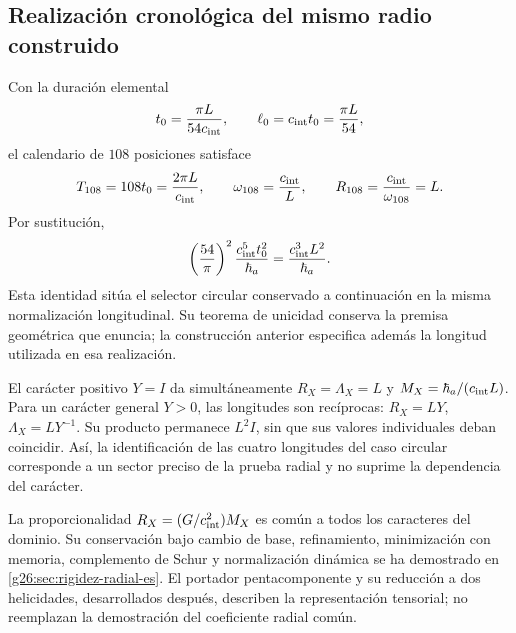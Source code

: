 \subsection{Realización cronológica del mismo radio construido}
\label{cr28:sec:radial-clock}
Con la duración elemental
\begin{equation}
 t_0=\frac{\pi L}{54c_{\rm int}},
 \qquad \ell_0=c_{\rm int}t_0=\frac{\pi L}{54},
 \label{cr28:eq:clock-from-length}
\end{equation}
el calendario de \(108\) posiciones satisface
\[
 T_{108}=108t_0=\frac{2\pi L}{c_{\rm int}},\qquad
 \omega_{108}=\frac{c_{\rm int}}{L},\qquad
 R_{108}=\frac{c_{\rm int}}{\omega_{108}}=L.
\]
Por sustitución,
\begin{equation}
 \left(\frac{54}{\pi}\right)^2
 \frac{c_{\rm int}^5t_0^2}{\hbar_a}
 =\frac{c_{\rm int}^3L^2}{\hbar_a}.
 \label{cr28:eq:circular-radial-agreement}
\end{equation}
Esta identidad sitúa el selector circular conservado a continuación en
la misma normalización longitudinal. Su teorema de unicidad conserva la
premisa geométrica que enuncia; la construcción anterior especifica además
la longitud utilizada en esa realización.

El carácter positivo \(Y=I\) da simultáneamente
\(R_X=\Lambda_X=L\) y \(M_X=\hbar_a/(c_{\rm int}L)\).
Para un carácter general \(Y>0\), las longitudes son recíprocas:
\(R_X=LY\), \(\Lambda_X=LY^{-1}\).
Su producto permanece \(L^2I\), sin que sus valores individuales deban
coincidir. Así, la identificación de las cuatro longitudes del caso
circular corresponde a un sector preciso de la prueba radial y no
suprime la dependencia del carácter.

La proporcionalidad \(R_X=(G/c_{\rm int}^{2})M_X\) es común a
todos los caracteres del dominio. Su conservación bajo cambio de base,
refinamiento, minimización con memoria, complemento de Schur y
normalización dinámica se ha demostrado en
\cref{g26:sec:rigidez-radial-es}. El portador pentacomponente y su
reducción a dos helicidades, desarrollados después, describen la
representación tensorial; no reemplazan la demostración del coeficiente
radial común.
